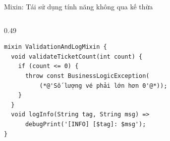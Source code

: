 \documentclass[aspectratio=169, 10pt]{beamer}
\begin{document}
\begin{frame}[fragile]{Mixin: Tái sử dụng tính năng không qua kế thừa}
\begin{columns}[t,onlytextwidth]
\begin{column}{0.49\textwidth}
      \vspace{0.04cm}
      \begin{lstlisting}[basicstyle=\ttfamily\scriptsize\color{black}, columns=flexible]
mixin ValidationAndLogMixin {
  void validateTicketCount(int count) {
    if (count <= 0) {
      throw const BusinessLogicException(
          (*@'Số lượng vé phải lớn hơn 0'@*));
    }
  }
  void logInfo(String tag, String msg) =>
      debugPrint('[INFO] [$tag]: $msg');
}
      \end{lstlisting}
    \end{column}
  \end{columns}
\end{frame}

\end{document}
